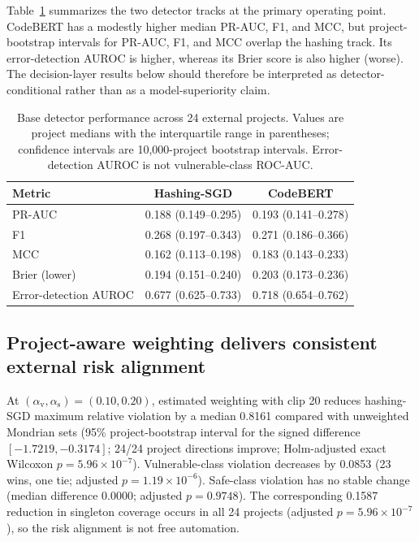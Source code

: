 \documentclass[preprint,12pt]{elsarticle}
\newcommand{\av}{\alpha_{\mathrm{v}}}
\newcommand{\as}{\alpha_{\mathrm{s}}}
\begin{document}
Table~\ref{tab:detector} summarizes the two detector tracks at the primary operating point. CodeBERT has a modestly higher median PR-AUC, F1, and MCC, but project-bootstrap intervals for PR-AUC, F1, and MCC overlap the hashing track. Its error-detection AUROC is higher, whereas its Brier score is also higher (worse). The decision-layer results below should therefore be interpreted as detector-conditional rather than as a model-superiority claim.

\begin{table}[t]
\centering
\caption{Base detector performance across 24 external projects. Values are project medians with the interquartile range in parentheses; confidence intervals are 10,000-project bootstrap intervals. Error-detection AUROC is not vulnerable-class ROC-AUC.}
\label{tab:detector}
\small
\begin{tabular}{lcc}
\toprule
Metric & Hashing-SGD & CodeBERT\\
\midrule
PR-AUC & 0.188 (0.149--0.295) & 0.193 (0.141--0.278)\\
F1 & 0.268 (0.197--0.343) & 0.271 (0.186--0.366)\\
MCC & 0.162 (0.113--0.198) & 0.183 (0.143--0.233)\\
Brier (lower) & 0.194 (0.151--0.240) & 0.203 (0.173--0.236)\\
Error-detection AUROC & 0.677 (0.625--0.733) & 0.718 (0.654--0.762)\\
\bottomrule
\end{tabular}
\end{table}

\subsection{Project-aware weighting delivers consistent external risk alignment}

At $(\av,\as)=(0.10,0.20)$, estimated weighting with clip 20 reduces hashing-SGD maximum relative violation by a median 0.8161 compared with unweighted Mondrian sets (95\% project-bootstrap interval for the signed difference $[-1.7219,-0.3174]$; 24/24 project directions improve; Holm-adjusted exact Wilcoxon $p=5.96\times10^{-7}$). Vulnerable-class violation decreases by 0.0853 (23 wins, one tie; adjusted $p=1.19\times10^{-6}$). Safe-class violation has no stable change (median difference 0.0000; adjusted $p=0.9748$). The corresponding 0.1587 reduction in singleton coverage occurs in all 24 projects (adjusted $p=5.96\times10^{-7}$), so the risk alignment is not free automation.
\end{document}

